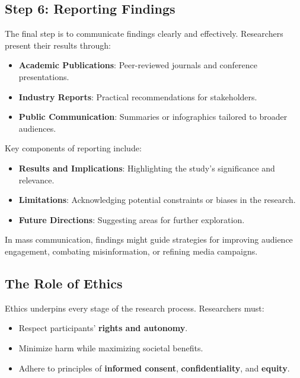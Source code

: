 \documentclass[
]{book}
\providecommand{\tightlist}{%
  \setlength{\itemsep}{0pt}\setlength{\parskip}{0pt}}
\begin{document}
\subsection*{Step 6: Reporting Findings}\label{step-6-reporting-findings}

The final step is to communicate findings clearly and effectively. Researchers present their results through:

\begin{itemize}
\tightlist
\item
  \textbf{Academic Publications}: Peer-reviewed journals and conference presentations.
\item
  \textbf{Industry Reports}: Practical recommendations for stakeholders.
\item
  \textbf{Public Communication}: Summaries or infographics tailored to broader audiences.
\end{itemize}

Key components of reporting include:

\begin{itemize}
\tightlist
\item
  \textbf{Results and Implications}: Highlighting the study's significance and relevance.
\item
  \textbf{Limitations}: Acknowledging potential constraints or biases in the research.
\item
  \textbf{Future Directions}: Suggesting areas for further exploration.
\end{itemize}

In mass communication, findings might guide strategies for improving audience engagement, combating misinformation, or refining media campaigns.

\subsection*{The Role of Ethics}\label{the-role-of-ethics}

Ethics underpins every stage of the research process. Researchers must:

\begin{itemize}
\tightlist
\item
  Respect participants' \textbf{rights and autonomy}.
\item
  Minimize harm while maximizing societal benefits.
\item
  Adhere to principles of \textbf{informed consent}, \textbf{confidentiality}, and \textbf{equity}.
\end{itemize}
\end{document}
